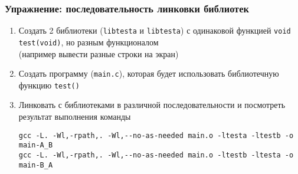 \begin{frame}[fragile]
	\frametitle{Упражнение: последовательность линковки библиотек}

	\begin{enumerate}
		\item Создать 2 библиотеки ({\tt libtesta} и {\tt libtesta})
			с одинаковой функцией {\tt void test(void)}, но разным функционалом\\
			(например вывести разные строки на экран)
		\item Создать программу ({\tt main.c}), которая будет использовать 
			библиотечную функцию {\tt test()}
		\item Линковать с библиотеками в различной последовательности и 
			посмотреть результат выполнения команды

\begin{verbatim}
gcc -L. -Wl,-rpath,. -Wl,--no-as-needed main.o -ltesta -ltestb -o main-A_B
gcc -L. -Wl,-rpath,. -Wl,--no-as-needed main.o -ltestb -ltesta -o main-B_A
\end{verbatim}
	\end{enumerate}
\end{frame}



